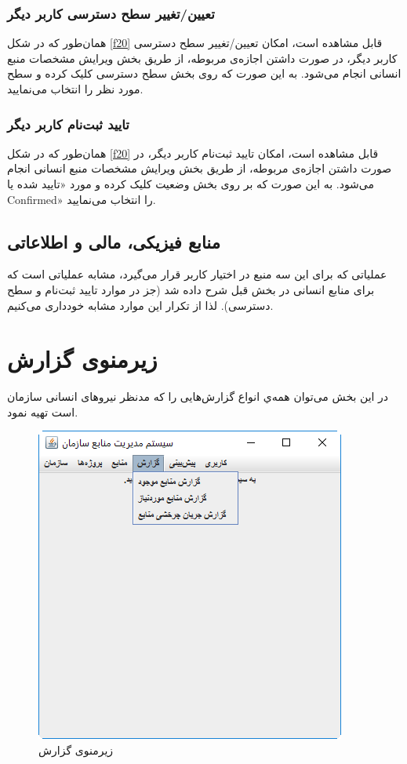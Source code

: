 \subsubsection{تعیین/تغییر سطح دسترسی کاربر دیگر}
همان‌طور که در شکل
\ref{f20}
قابل مشاهده است، امکان تعیین/تغییر سطح دسترسی کاربر دیگر، در صورت داشتن اجازه‌ی مربوطه، از طریق بخش ویرایش مشخصات منبع انسانی انجام می‌شود. به این صورت که روی بخش سطح دسترسی کلیک کرده و سطح مورد نظر را انتخاب می‌نمایید.

\subsubsection{تایید ثبت‌نام کاربر دیگر}
همان‌طور که در شکل
\ref{f20}
قابل مشاهده است، امکان تایید ثبت‌نام کاربر دیگر، در صورت داشتن اجازه‌ی مربوطه، از طریق بخش ویرایش مشخصات منبع انسانی انجام می‌شود. به این صورت که بر روی بخش وضعیت کلیک کرده و مورد «تایید شده یا Confirmed» را انتخاب می‌نمایید.


\subsection{منابع فیزیکی، مالی و اطلاعاتی}
عملیاتی که برای این سه منبع در اختیار کاربر قرار می‌گیرد، مشابه عملیاتی است که برای منابع انسانی در بخش قبل شرح داده شد (جز در موارد تایید ثبت‌نام و سطح دسترسی).   لذا از تکرار این موارد مشابه خودداری می‌کنیم.

\newpage
\section{زیرمنوی گزارش}
در این بخش می‌توان همه‌ي انواع گزارش‌هایی را که مدنظر نیروهای انسانی سازمان است تهیه نمود.
	\begin{figure}[H]
		\centering
		\includegraphics[scale=0.7]{img/manual/repSubmenu}
		\caption{زیرمنوی گزارش}
	\end{figure}
	
